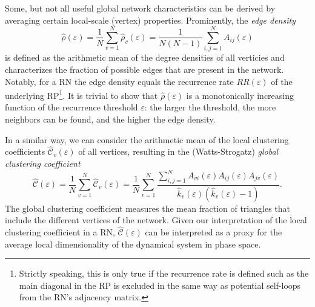 Some, but not all useful global network characteristics can be derived by averaging certain local-scale (vertex) properties. Prominently, the \textit{edge density}
\begin{equation}
\hat{\rho}(\varepsilon)=\frac{1}{N}\sum_{v=1}^N \hat{\rho}_v(\varepsilon)=\frac{1}{N(N-1)} \sum_{i,j=1}^N A_{ij}(\varepsilon)
\label{eq:edgedensity}
\end{equation}
\noindent
is defined as the arithmetic mean of the degree densities of all verticies and characterizes the fraction of possible edges that are present in the network. Notably, for a RN the edge density equals the recurrence rate $RR(\varepsilon)$ of the underlying RP\footnote{Strictly speaking, this is only true if the recurrence rate is defined such as the main diagonal in the RP is excluded in the same way as potential self-loops from the RN's adjacency matrix.}. It is trivial to show that $\hat{\rho}(\varepsilon)$ is a monotonically increasing function of the recurrence threshold $\varepsilon$: the larger the threshold, the more neighbors can be found, and the higher the edge density.

In a similar way, we can consider the arithmetic mean of the local clustering coefficients $\hat{\mathcal{C}}_v(\varepsilon)$ of all vertices, resulting in the (Watts-Strogatz) \textit{global clustering coefficient}~\cite{Watts1998}
\begin{equation}
\hat{\mathcal{C}}(\varepsilon)=\frac{1}{N}\sum_{v=1}^N \hat{\mathcal{C}}_v(\varepsilon)
= \frac{1}{N}\sum_{v=1}^N \frac{\sum_{i,j=1}^N A_{vi}(\varepsilon) A_{ij}(\varepsilon) A_{jv}(\varepsilon)}{\hat{k}_v(\varepsilon)(\hat{k}_v(\varepsilon)-1)}.
\label{eq:globclustering}
\end{equation}
\noindent
The global clustering coefficient measures the mean fraction of triangles that include the different vertices of the network. Given our interpretation of the local clustering coefficient in a RN, $\hat{\mathcal{C}}(\varepsilon)$ can be interpreted as a proxy for the average local dimensionality of the dynamical system in phase space.

